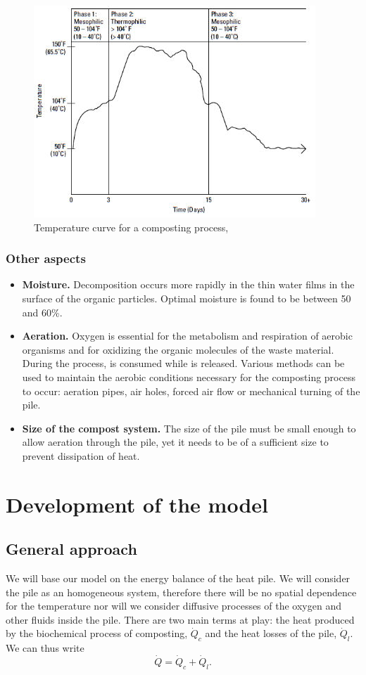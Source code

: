 \documentclass[12pt, a4paper, twocolumn, twoside]{article}
\numberwithin{table}{section}
\numberwithin{figure}{section}
\numberwithin{equation}{section}
\begin{document}
\begin{figure}[htb]
	\sffamily \footnotesize \centering
	\includegraphics[scale=0.55]{model-T.jpg}
	\caption{Temperature curve for a composting process, \cite{dummies}}
	\label{fig:corba model}
\end{figure}

\subsubsection{Other aspects}
\begin{itemize}
	\item \textbf{Moisture.} Decomposition occurs more rapidly in the thin water films in the surface of the organic particles. Optimal moisture is found to be between 50 and 60\%.
	\item  \textbf{Aeration.} Oxygen is essential for the metabolism and respiration of aerobic organisms and for oxidizing the organic molecules of the waste material. During the process,  is consumed while  is released. Various methods can be used to maintain the aerobic conditions necessary for the composting process to occur: aeration pipes, air holes, forced air flow or mechanical turning of the pile.
	\item  \textbf{Size of the compost system.} The size of the pile must be small enough to allow aeration through the pile, yet it needs to be of a sufficient size to prevent dissipation of heat.
	\end{itemize}

\section{Development of the model}
\subsection{General approach}
We will base our model on the energy balance of the heat pile. We will consider the pile as an homogeneous system, therefore there will be no spatial dependence for the temperature nor will we consider diffusive processes of the oxygen and other fluids inside the pile. There are two main terms at play: the heat produced by the biochemical process of composting, \( \dot{Q}_c \) and the heat losses of the pile, \( \dot{Q}_l \). We can thus write
\begin{equation} \label{eq:first balance}
	\dot{Q} = \dot{Q}_c + \dot{Q}_l. 
\end{equation}
\end{document}
